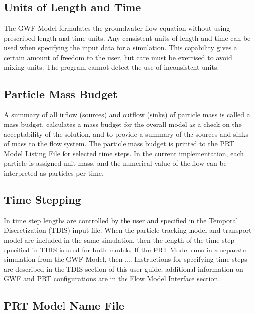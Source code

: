 \subsection{Units of Length and Time}
The GWF Model formulates the groundwater flow equation without using prescribed length and time units. Any consistent units of length and time can be used when specifying the input data for a simulation. This capability gives a certain amount of freedom to the user, but care must be exercised to avoid mixing units.  The program cannot detect the use of inconsistent units.

\subsection{Particle Mass Budget}
A summary of all inflow (sources) and outflow (sinks) of particle mass is called a mass budget.  \mf calculates a mass budget for the overall model as a check on the acceptability of the solution, and to provide a summary of the sources and sinks of mass to the flow system.  The particle mass budget is printed to the PRT Model Listing File for selected time steps.  In the current implementation, each particle is assigned unit mass, and the numerical value of the flow can be interpreted as particles per time.

\subsection{Time Stepping}
In \mf time step lengths are controlled by the user and specified in the Temporal Discretization (TDIS) input file.  When the particle-tracking model and transport model are included in the same simulation, then the length of the time step specified in TDIS is used for both models.  If the PRT Model runs in a separate simulation from the GWF Model, then ....  Instructions for specifying time steps are described in the TDIS section of this user guide; additional information on GWF and PRT configurations are in the Flow Model Interface section.  



\newpage
\subsection{PRT Model Name File}


%

